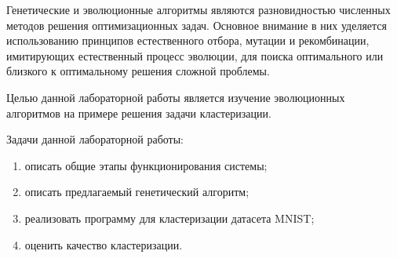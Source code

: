 
Генетические и эволюционные алгоритмы являются разновидностью численных методов
решения оптимизационных задач. Основное внимание в них уделяется использованию принципов естественного отбора, мутации и рекомбинации, имитирующих естественный процесс
эволюции, для поиска оптимального или близкого к оптимальному решения сложной проблемы.

Целью данной лабораторной работы является изучение эволюционных алгоритмов на примере решения задачи кластеризации.

Задачи данной лабораторной работы:
\begin{enumerate}[label*=\arabic*)]
	\item описать общие этапы функционирования системы;
	\item  описать предлагаемый генетический алгоритм;
	\item  реализовать программу для кластеризации датасета MNIST;
	\item  оценить качество кластеризации.
\end{enumerate}

\clearpage
